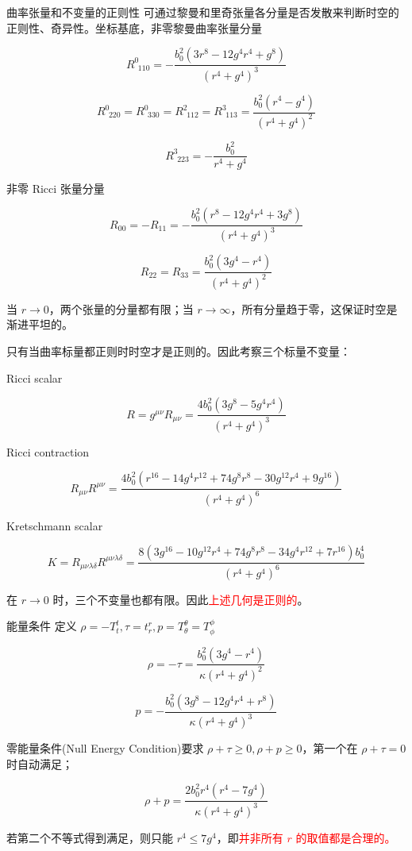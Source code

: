 \documentclass[9pt, dvipsnames]{beamer} %
\begin{document}
\begin{frame}{曲率张量和不变量的正则性}
    可通过黎曼和里奇张量各分量是否发散来判断时空的正则性、奇异性。坐标基底，非零黎曼曲率张量分量

    $$
    R^0_{~~ 110} 
    =-\frac{b_0^2\left(3r^8 - 12 g^4 r^4 + g^8 \right) }{\left(r^4+g^4 \right)^3 } 
    $$
    
    $$
    R^0_{~~220} = R^0_{~~330} = R^2_{~~112} = R^3_{~~113}
    =\frac{b_0^2\left(r^4-g^4 \right) }{\left(r^4+g^4 \right)^2 }
    $$
    
    $$
    R^3_{~~223}
    =-\frac{b_0^2 }{r^4+g^4 } 
    $$
    
    非零 Ricci 张量分量
    
    $$
    R_{00} = -R_{11} = -\frac{b_0^2\left(r^8-12g^4r^4+3g^8 \right) }{\left(r^4+g^4 \right)^3 } 
    $$
    
    $$
    R_{22} = R_{33} = \frac{b_0^2 \left(3g^4-r^4 \right) }{\left(r^4+g^4 \right)^2 }
    $$
    
    当 $r\to 0 $，两个张量的分量都有限；当 $r\to \infty $，所有分量趋于零，这保证时空是渐进平坦的。
\end{frame}

\begin{frame}
    只有当曲率标量都正则时时空才是正则的。因此考察三个标量不变量：
    
    Ricci scalar
    
    $$
    R = g^{\mu\nu}R_{\mu\nu}
    =\frac{4b_0^2\left(3g^8-5g^4r^4 \right) }{\left(r^4+g^4 \right)^3 }
    $$
    
    Ricci contraction
    
    $$
    R_{\mu\nu} R^{\mu\nu}
    =\frac{4b_0^2 \left(r^{16}-14g^4r^{12}+74g^8r^8-30g^{12}r^4+9g^{16} \right) }{\left(r^4+g^4 \right)^6 }
    $$
    
    Kretschmann scalar
    
    $$
    K
    =R_{\mu\nu\lambda\delta} R^{\mu\nu\lambda\delta}
    =\frac{8\left(3g^{16}-10g^{12}r^4+74 g^8 r^8-34g^4r^{12}+7r^{16} \right)b_0^4 }{\left(r^4+g^4 \right)^6 }
    $$
    
    在 $r\to 0$ 时，三个不变量也都有限。因此\textcolor{red}{上述几何是正则的}。
\end{frame}

\begin{frame}{能量条件}
    定义 $\rho=-T_t^t,\tau=t_r^r,p=T_\theta^\theta=T_\phi^\phi $

    $$
    \rho=-\tau
    =\frac{b_0^2\left(3g^4-r^4 \right) }{\kappa \left(r^4+g^4 \right)^2 } 
    $$
    
    $$
    p
    =-\frac{b_0^2\left(3g^8-12g^4r^4+r^8 \right) }{\kappa \left(r^4+g^4 \right)^3 }
    $$
    
    零能量条件(Null Energy Condition)要求 $\rho+\tau \geqslant 0,\rho+p\geqslant 0 $，第一个在 $\rho+\tau=0 $ 时自动满足；
    
    $$
    \rho+p
    =\frac{2b_0^2 r^4\left(r^4-7g^4 \right) }{\kappa \left(r^4+g^4 \right)^3 }
    $$
    
    若第二个不等式得到满足，则只能 $r^4\leqslant 7g^4 $，即\textcolor{red}{并非所有 $r$ 的取值都是合理的。}
\end{frame}
\end{document}
